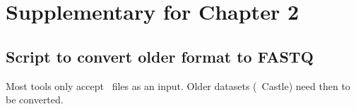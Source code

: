 \chapter{Supplementary for Chapter 2}\label{ch:SupplData}


\section{Script to convert older format to FASTQ}%
\label{code:fastq}
Most tools only accept \fastq\ files as an input. Older datasets (\eg\ Castle)
need then to be converted.

\inputminted{pl}{app/scripts/fastq2phred33.pl}







